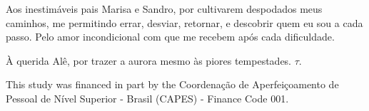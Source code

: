 \begin{agradecimentos}
Aos inestimáveis pais Marisa e Sandro, por cultivarem despodados meus caminhos, me permitindo errar, desviar, retornar, e descobrir quem eu sou a cada passo. Pelo amor incondicional com que me recebem após cada dificuldade.

À querida Alê, por trazer a aurora mesmo às piores tempestades. $\tau$.


\vfill

This study was financed in part by the Coordenação de Aperfeiçoamento de Pessoal de Nível Superior - Brasil (CAPES) - Finance Code 001.

\end{agradecimentos}
% 
